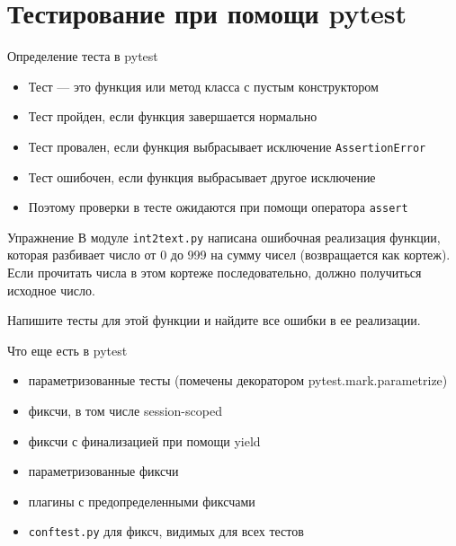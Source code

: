 \documentclass[hyperref={unicode=true}]{beamer}
\begin{document}
    \section{Тестирование при помощи pytest}

    \begin{frame}{Определение теста в pytest}
    \begin{itemize}
    \item Тест --- это функция или метод класса с пустым конструктором
    \item Тест пройден, если функция завершается нормально
    \item Тест провален, если функция выбрасывает исключение \texttt{AssertionError}
    \item Тест ошибочен, если функция выбрасывает другое исключение
    \item Поэтому проверки в тесте ожидаются при помощи оператора \texttt{assert}
    \end{itemize}
    \end{frame}

    \begin{frame}{Упражнение}
    В модуле \texttt{int2text.py} написана ошибочная реализация функции,
    которая разбивает число от 0 до 999 на сумму чисел (возвращается как кортеж).
    Если прочитать числа в этом кортеже последовательно, должно получиться
    исходное число.

    Напишите тесты для этой функции и найдите все ошибки в ее реализации.
    \end{frame}

    \begin{frame}{Что еще есть в pytest}
    \begin{itemize}
    \item параметризованные тесты (помечены декоратором pytest.mark.parametrize)
    \item фиксчи, в том числе session-scoped
    \item фиксчи с финализацией при помощи yield
    \item параметризованные фиксчи
    \item плагины с предопределенными фиксчами
    \item \texttt{conftest.py} для фиксч, видимых для всех тестов
    \end{itemize}
    \end{frame}
\end{document}
